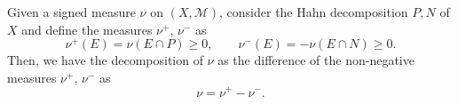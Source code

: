 \documentclass[11pt]{article}
\newcommand{\M}{\mathcal{M}}
\theoremstyle{definition}
\theoremstyle{remark}
\begin{document}
    \begin{corollary}
        Given a signed measure $\nu$ on $(X, \M)$, consider the Hahn decomposition
        $P, N$ of $X$ and define the measures $\nu^+$, $\nu^-$ as \[
            \nu^+(E) = \nu(E \cap P) \geq 0, \qquad
            \nu^-(E) = -\nu(E \cap N) \geq 0.
        \] Then, we have the decomposition of $\nu$ as the difference of the non-negative
        measures $\nu^+$, $\nu^-$ as \[
            \nu = \nu^+ - \nu^-.
        \]
    \end{corollary}
\end{document}
